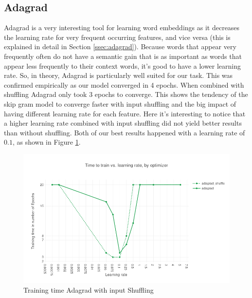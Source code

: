 \subsection{Adagrad}
Adagrad \cite{adagrad} is a very interesting tool for learning word embeddings as it decreases the learning rate for very frequent occurring features, and vice versa (this is explained in detail in Section \ref{ssec:adagrad}). Because words that appear very frequently often do not have a semantic gain that is as important as words that appear less frequently to their context words, it's good to have a lower learning rate. So, in theory, Adagrad is particularly well suited for our task. This was confirmed empirically as our model converged in 4 epochs. When combined with shuffling Adagrad only took 3 epochs to converge. This shows the tendency of the skip gram model to converge faster with input shuffling and the big impact of having different learning rate for each feature.
Here it's interesting to notice that a higher learning rate combined with input shuffling did not yield better results than without shuffling. Both of our best results happened with a learning rate of $0.1$, as shown in Figure \ref{fig:results_adagrad_shuffle}.
\begin{figure}[h]
\centering
\includegraphics[scale=0.45]{images/results_adagrad_shuffle}
\caption{Training time Adagrad with input Shuffling}
\label{fig:results_adagrad_shuffle}
\end{figure}
